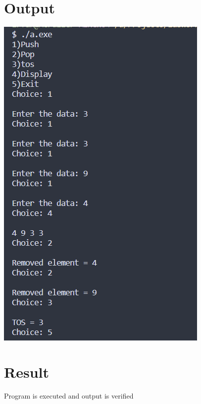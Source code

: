 \section{Output}
\includegraphics[]{Cycle_1/Outputs/Stack.png}

\section{Result}
Program is executed and output is verified